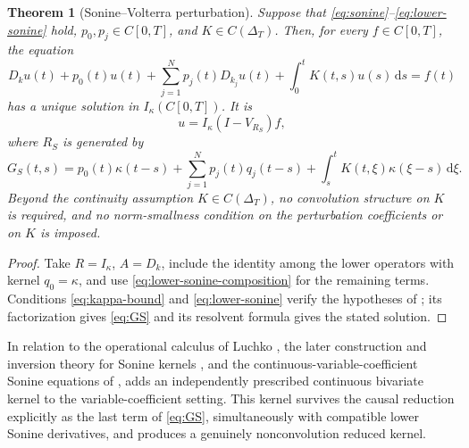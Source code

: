 \documentclass[11pt]{article}
\numberwithin{equation}{section}
\newtheorem{theorem}{Theorem}
\theoremstyle{definition}
\theoremstyle{remark}
\newcommand{\dd}{\,\mathrm d}
\begin{document}
\begin{theorem}[Sonine--Volterra perturbation]\label{thm:sonine-volterra}
Suppose that \eqref{eq:sonine}--\eqref{eq:lower-sonine} hold, $p_0,p_j\in C[0,T]$, and $K\in C(\Delta_T)$. Then, for every $f\in C[0,T]$, the equation
\begin{equation}
D_ku(t)+p_0(t)u(t)+\sum_{j=1}^{N}p_j(t)D_{k_j}u(t)
+\int_0^tK(t,s)u(s)\dd s=f(t)
\label{eq:sonine-volterra}
\end{equation}
has a unique solution in $I_\kappa(C[0,T])$. It is
\begin{equation}
u=I_\kappa(I-V_{R_S})f,
\end{equation}
where $R_S$ is generated by
\begin{equation}
G_S(t,s)=p_0(t)\kappa(t-s)
+\sum_{j=1}^{N}p_j(t)q_j(t-s)
+\int_s^tK(t,\xi)\kappa(\xi-s)\dd\xi.
\label{eq:GS}
\end{equation}
Beyond the continuity assumption $K\in C(\Delta_T)$, no convolution structure on $K$ is required, and no norm-smallness condition on the perturbation coefficients or on $K$ is imposed.
\end{theorem}

\begin{proof}
Take $R=I_\kappa$, $A=D_k$, include the identity among the lower operators with kernel $q_0=\kappa$, and use \eqref{eq:lower-sonine-composition} for the remaining terms. Conditions \eqref{eq:kappa-bound} and \eqref{eq:lower-sonine} verify the hypotheses of ; its factorization gives \eqref{eq:GS} and its resolvent formula gives the stated solution.
\end{proof}

In relation to the operational calculus of Luchko \cite{Luchko2021}, the later construction and inversion theory for Sonine kernels \cite{Luchko2022,Ortigueira2024}, and the continuous-variable-coefficient Sonine equations of \cite{Guzoglu2026},  adds an independently prescribed continuous bivariate kernel to the variable-coefficient setting. This kernel survives the causal reduction explicitly as the last term of \eqref{eq:GS}, simultaneously with compatible lower Sonine derivatives, and produces a genuinely nonconvolution reduced kernel.
\end{document}
